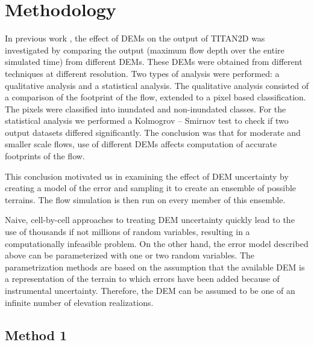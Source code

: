 \documentclass[12pt]{article}
\begin{document}
\section{Methodology}

In previous work \citep{stefanescu1}, the effect of DEMs on the output
of TITAN2D %
was investigated by comparing the output
(maximum flow depth over the entire simulated time) from different
DEMs.  These DEMs were obtained from different techniques at different
resolution. Two types of analysis were performed: a qualitative
analysis and a statistical analysis. The qualitative analysis
consisted of a comparison of the footprint of the flow, extended to a
pixel based classification. The pixels were classified into inundated
and non-inundated classes. For the statistical analysis we performed a
Kolmogrov -- Smirnov test to check if two output datasets differed
significantly. The conclusion was that for moderate and smaller scale
flows, use of different DEMs affects computation of accurate
footprints of the flow.

This conclusion motivated us in examining the effect of DEM
uncertainty by creating a model of the error and sampling it to create
an ensemble of possible terrains.  The flow simulation is then run on
every member of this ensemble.

Naive, cell-by-cell approaches to treating DEM uncertainty quickly
lead to the use of thousands if not millions of random variables,
resulting in a computationally infeasible problem.  On the other hand,
the error model described above can be parameterized with one or two
random variables.  The parametrization methods are based on the
assumption that the available DEM is a representation of the terrain
to which errors have been added because of instrumental uncertainty.
Therefore, the DEM can be assumed to be one of an infinite number of
elevation realizations.


\subsection{Method 1}
\label{Method1}
\end{document}
